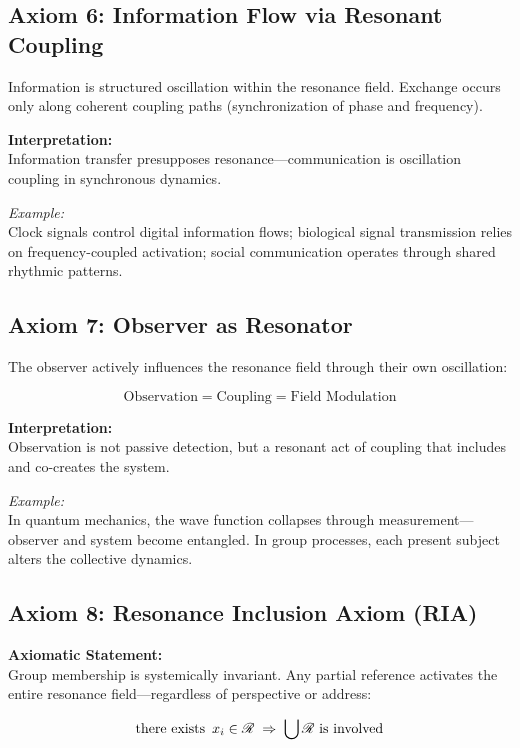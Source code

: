 \documentclass[12pt]{iopart}
\providecommand{\mathcal}[1]{\mathscr{#1}}
\providecommand{\text}[1]{\mbox{#1}}
\providecommand{\exists}{\hbox{there exists }}
\begin{document}
\subsection{Axiom 6: Information Flow via Resonant Coupling}

Information is structured oscillation within the resonance field. Exchange occurs only along coherent coupling paths (synchronization of phase and frequency).

\textbf{Interpretation:}\\
Information transfer presupposes resonance—communication is oscillation coupling in synchronous dynamics.

\textit{Example:}\\
Clock signals control digital information flows; biological signal transmission relies on frequency-coupled activation; social communication operates through shared rhythmic patterns.

\subsection{Axiom 7: Observer as Resonator}

The observer actively influences the resonance field through their own oscillation:

$$
\text{Observation} = \text{Coupling} = \text{Field Modulation}
$$

\textbf{Interpretation:}\\
Observation is not passive detection, but a resonant act of coupling that includes and co-creates the system.

\textit{Example:}\\
In quantum mechanics, the wave function collapses through measurement—observer and system become entangled. In group processes, each present subject alters the collective dynamics.

\newpage

\subsection{Axiom 8: Resonance Inclusion Axiom (RIA)}

\textbf{Axiomatic Statement:}\\
Group membership is systemically invariant. Any partial reference activates the entire resonance field—regardless of perspective or address:

$$
\exists\, x_i \in \mathcal{R} \;\Rightarrow\; \bigcup \mathcal{R} \text{ is involved}
$$
\end{document}
